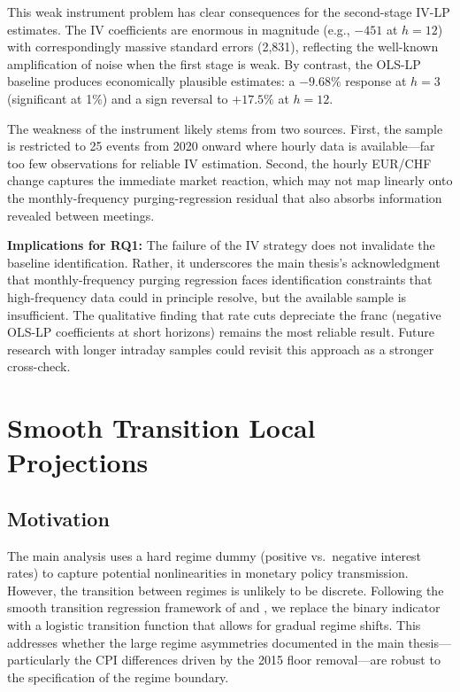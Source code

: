 \documentclass[12pt,a4paper]{article}
\begin{document}
This weak instrument problem has clear consequences for the second-stage IV-LP estimates. The IV coefficients are enormous in magnitude (e.g., $-451$ at $h=12$) with correspondingly massive standard errors (2,831), reflecting the well-known amplification of noise when the first stage is weak. By contrast, the OLS-LP baseline produces economically plausible estimates: a $-9.68\%$ response at $h=3$ (significant at 1\%) and a sign reversal to $+17.5\%$ at $h=12$.

The weakness of the instrument likely stems from two sources. First, the sample is restricted to 25 events from 2020 onward where hourly data is available---far too few observations for reliable IV estimation. Second, the hourly EUR/CHF change captures the immediate market reaction, which may not map linearly onto the monthly-frequency purging-regression residual that also absorbs information revealed between meetings.

\textbf{Implications for RQ1:} The failure of the IV strategy does not invalidate the baseline identification. Rather, it underscores the main thesis's acknowledgment that monthly-frequency purging regression faces identification constraints that high-frequency data could in principle resolve, but the available sample is insufficient. The qualitative finding that rate cuts depreciate the franc (negative OLS-LP coefficients at short horizons) remains the most reliable result. Future research with longer intraday samples could revisit this approach as a stronger cross-check.


\section{Smooth Transition Local Projections}\label{sec:smooth}

\subsection{Motivation}

The main analysis uses a hard regime dummy (positive vs.\ negative interest rates) to capture potential nonlinearities in monetary policy transmission. However, the transition between regimes is unlikely to be discrete. Following the smooth transition regression framework of \citet{auerbach2013} and \citet{tenreyro2016}, we replace the binary indicator with a logistic transition function that allows for gradual regime shifts. This addresses whether the large regime asymmetries documented in the main thesis---particularly the CPI differences driven by the 2015 floor removal---are robust to the specification of the regime boundary.
\end{document}
